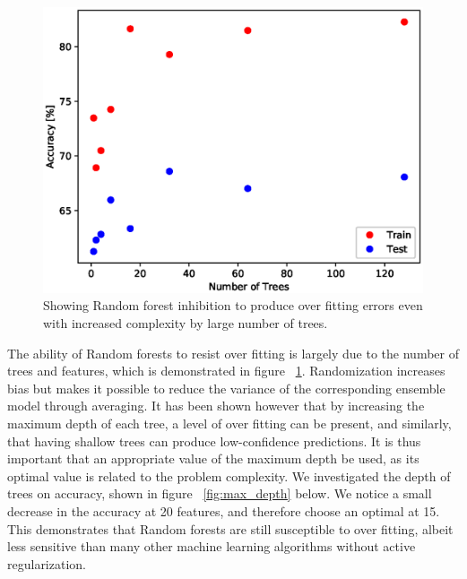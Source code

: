 \documentclass{article} %
\begin{document}
\begin{figure}[h]
\begin{center}
\includegraphics[scale=0.5]{n_trees}
\end{center}
\caption{Showing Random forest inhibition to produce over fitting errors even with increased complexity by large number of trees.}
\label{fig:n_trees}
\end{figure}

The ability of Random forests to resist over fitting is largely due to the number of trees and features, which is demonstrated in figure ~\ref{fig:n_trees}. Randomization increases bias but makes it possible to reduce the variance of the corresponding ensemble model through averaging. \cite{formann-roe_2012} It has been shown however that by increasing the maximum depth of each tree, a level of over fitting can be present, and similarly, that having shallow trees can produce low-confidence predictions. \cite{Criminisi2011} It is thus important that an appropriate value of the maximum depth be used, as its optimal value is related to the problem complexity. We investigated the depth of trees on accuracy, shown in figure ~\ref{fig:max_depth} below. We notice a small decrease in the accuracy at 20 features, and therefore choose an optimal at 15. This demonstrates that Random forests are still susceptible to over fitting, albeit less sensitive than many other machine learning algorithms without active regularization.
\end{document}
